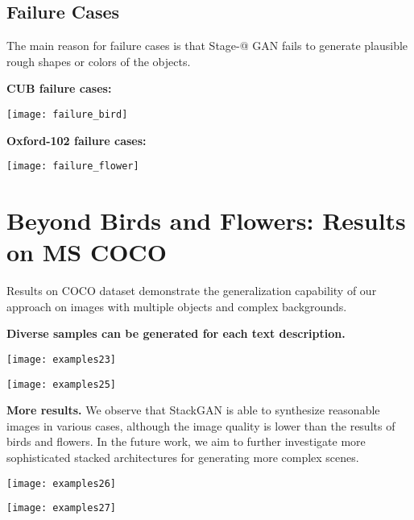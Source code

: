 \documentclass[10pt,twocolumn,letterpaper]{article}
\makeatletter
\newcommand{\Rmnum}[1]{\expandafter\@slowromancap\romannumeral #1@}
\makeatother
\begin{document}
\subsection*{Failure Cases}
The main reason for failure cases is that Stage-\Rmnum{1} GAN fails to generate plausible rough shapes or colors of the objects. 

\vspace{+5pt}
\textbf{CUB failure cases:}
\vspace{+5pt}

\texttt{[image: failure\_bird]}


\vspace{+10pt}
\textbf{Oxford-102 failure cases:}
\vspace{+5pt}

\texttt{[image: failure\_flower]}
\vspace{+205pt}





\section*{Beyond Birds and Flowers: Results on MS COCO}
\vspace{+5pt}

Results on COCO dataset demonstrate the generalization capability of our approach on images with multiple objects and complex backgrounds.

\vspace{+5pt}
\textbf{Diverse samples can be generated for each text description. }
\vspace{+5pt}



\texttt{[image: examples23]}
\vspace{+5pt}

\texttt{[image: examples25]}
\vspace{+5pt}

\vspace{+15pt}
\textbf{More results. }
We observe that StackGAN is able to synthesize reasonable images in various cases, although the image quality is lower than the results of birds and flowers. In the future work, we aim to further investigate more sophisticated stacked architectures for generating more complex scenes. 

\vspace{+5pt}
\texttt{[image: examples26]}
\vspace{+5pt}

\texttt{[image: examples27]}
\end{document}
